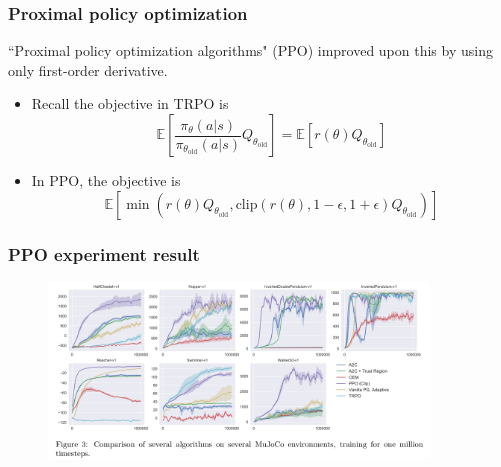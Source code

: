 \documentclass[9pt]{beamer}
\theoremstyle{remark}
\begin{document}
\begin{frame}
    \frametitle{Proximal policy optimization}
    ``Proximal policy optimization algorithms" (PPO) improved upon this by using only first-order derivative.
    \begin{itemize}
        \item Recall the objective in TRPO is
            \[
                \mathbb{E} \left[ \dfrac{\pi_{\theta}(a|s)}{\pi_{\theta_{\text{old}}}(a|s)} Q_{\theta_{\text{old}}} \right] = \mathbb{E}[r(\theta) Q_{\theta_{\text{old}}}]
            \] 
        \item In PPO, the objective is
            \[
                \mathbb{E} \left[  \min(  r(\theta) Q_{\theta_{\text{old}}} , \text{clip}(r(\theta), 1-\epsilon, 1+\epsilon)Q_{\theta_{\text{old}}}) \right]
            \] 
    \end{itemize}
\end{frame}

\begin{frame}
    \frametitle{PPO experiment result}
    \begin{figure}
       \centering
       \includegraphics[width=0.9\textwidth]{figures/ppo.png}
   \end{figure}    
\end{frame}
\end{document}
